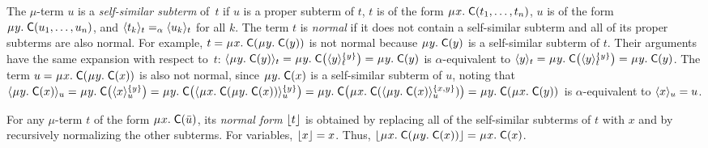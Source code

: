 The $\mu$-term $u$
is a \emph{self-similar subterm} of~$t$ if
$u$ is a proper subterm of $t$,
$t$ is of the form $\MU x.\; \const{C}( t_1, \ldots, t_n )$,
$u$ is of the form $\MU y.\; \const{C}( u_1, \ldots, u_n )$,
and $\expand{t}{ t_k } \aequiv \expand{t}{ u_k }$ for all $k$. %
The term $t$ is \emph{normal} if it does not contain a self-similar subterm
and all of its proper subterms are also normal.
For example, $t = \MU x.\; \const{C}( \MU y.\; \const{C}( y ) )$ is not normal
because $\MU y.\; \const{C}( y )$ is a self-similar subterm of $t$.
Their arguments have the same expansion with respect to~$t$:
$\expand{t}{\MU y.\; \const{C}( y )} =
\MU y.\; \const{C}\bigl( \expand{t}{y}^{\smash{\{y\}}} \bigr) =
\MU y.\; \const{C}( y )$
is $\alpha$-equivalent to
$\expand{t}{y} =
\MU y.\; \const{C}\bigl( \expand{t}{y}^{\smash{\{y\}}} \bigr) =
\MU y.\; \const{C}( y )$.
The term $u = \MU x.\; \const{C}( \MU y.\; \const{C}( x ) )$ is also not normal,
since $\MU y.\; \const{C}( x )$ is a self-similar subterm of $u$,
noting that
%
$\expand{u}{\MU y.\; \const{C}( x )}
 = \MU y.\; \const{C}\bigl( \expand{u}{x}^{\smash{\{y\}}} \bigr)
 = \MU y.\; \const{C}\bigl( \expand{u}{\MU x.\; \const{C}( \MU y.\; \const{C}( x ) ) }^{\smash{\{y\}}} \bigr)
 = \MU y.\; \const{C}\bigl( \MU x.\; \const{C}( \expand{u}{\MU y.\; \const{C}( x )}^{\smash{\{x,y\}}} ) \bigr)
 = \MU y.\allowbreak\; \const{C}( \MU x.\allowbreak\; \const{C}( y ) )$
is $\alpha$-equivalent to $\expand{u}{x} = u$.

For any $\mu$-term $t$ of the form $\MU x.\; \const C( \vec u )$,
its \emph{normal form} $\nf{t}$ is obtained
by replacing all of the self-similar subterms of $t$ with $x$
and by recursively normalizing the other subterms.
For variables, $\nf{x} = x$.
Thus, $\nf{\MU x.\; \const{C}( \MU y.\; \const{C}( x ) )} = \MU x.\; \const{C}( x )$.

